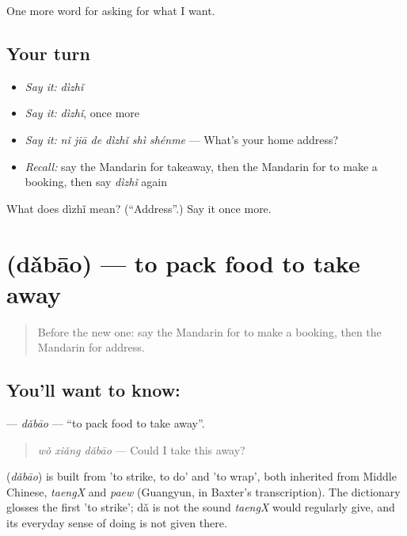 \begin{grammarlens}[title={What you've built}]
One more word for asking for what I want.
\end{grammarlens}

\subsection*{Your turn}
\begin{itemize}
\raggedright
  \item \emph{Say it:} \emph{dìzhǐ}
  \item \emph{Say it:} \emph{dìzhǐ}, once more
  \item \emph{Say it:} \emph{nǐ jiā de dìzhǐ shì shénme} — What's your home address?
  \item \emph{Recall:} say the Mandarin for takeaway, then the Mandarin for to make a booking, then say \emph{dìzhǐ} again
\end{itemize}

\begin{tcolorbox}[breakable,colback=teal!4,colframe=teal!35!black,title={Before you move on}]
What does dìzhǐ mean? (\textquotedblleft{}Address\textquotedblright{}.) Say it once more.
\end{tcolorbox}
\section[\texorpdfstring{\zh{打包} (dǎbāo)}{打包 (dǎbāo)}]{ (dǎbāo) — to pack food to take away}

\label{lesson:ZH-C120-dabao}



\begin{quote}
Before the new one: say the Mandarin for to make a booking, then the Mandarin for address.
\end{quote}

\subsection*{You'll want to know: }
\textbf{} — \emph{dǎbāo} — \textquotedblleft{}to pack food to take away\textquotedblright{}.

\begin{quote}
\textbf{} \emph{wǒ xiǎng dǎbāo} — Could I take this away?
\end{quote}

\begin{cousinweb}
\textbf{} (\emph{dǎbāo}) is built from  'to strike, to do' and  'to wrap', both inherited from Middle Chinese, \emph{taengX} and \emph{paew} (Guangyun, in Baxter's transcription). The dictionary glosses the first 'to strike'; dǎ is not the sound \emph{taengX} would regularly give, and its everyday sense of doing is not given there.
\end{cousinweb}


